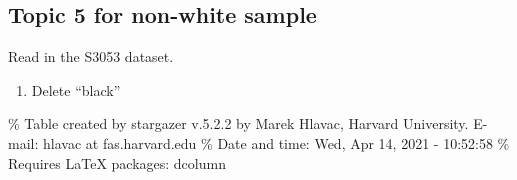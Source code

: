 \documentclass[
]{article}
\providecommand{\tightlist}{%
  \setlength{\itemsep}{0pt}\setlength{\parskip}{0pt}}
\begin{document}
\hypertarget{topic-5-for-non-white-sample}{%
\subsection{Topic 5 for non-white
sample}\label{topic-5-for-non-white-sample}}

Read in the S3053 dataset.

\begin{enumerate}
\def\labelenumi{\arabic{enumi}.}
\tightlist
\item
  Delete ``black''
\end{enumerate}

\% Table created by stargazer v.5.2.2 by Marek Hlavac, Harvard
University. E-mail: hlavac at fas.harvard.edu \% Date and time: Wed, Apr
14, 2021 - 10:52:58 \% Requires LaTeX packages: dcolumn
\end{document}
